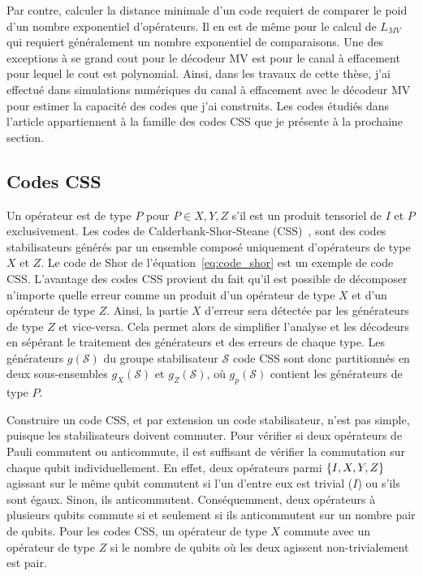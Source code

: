 Par contre,
calculer la distance minimale d'un code requiert de comparer le poid d'un nombre exponentiel d'opérateurs.
Il en est de même pour le calcul de $L_{MV}$ qui requiert généralement un nombre exponentiel de comparaisons.
Une des exceptions à se grand cout pour le décodeur MV est pour le canal à effacement pour lequel
le cout est  polynomial.
Ainsi, dans les travaux de cette thèse,
j'ai effectué dans simulations numériques du canal à effacement avec le décodeur MV pour estimer la
capacité des codes que j'ai construits.
Les codes étudiés dans l'article appartiennent 
à la famille des codes CSS que je présente à la prochaine section.

\subsection{Codes CSS}

Un opérateur est de type $P$ pour $P \in {X, Y, Z}$ s'il est un produit tensoriel de $I$ et $P$ exclusivement.
Les codes de Calderbank-Shor-Steane (CSS)~\cite{calderbank_good_1996, steane_multiple-particle_nodate},
sont des codes stabilisateurs générés par un ensemble composé uniquement d'opérateurs de type $X$ et $Z$.
Le code de Shor de l'équation~\ref{eq:code_shor} est un exemple de code CSS.
L'avantage des codes CSS provient du fait qu'il est possible de décomposer n'importe quelle erreur
comme un produit d'un opérateur de type $X$ et d'un opérateur de type $Z$.
Ainsi,
la partie $X$ d'erreur sera détectée par les générateurs de type $Z$ et vice-versa.
Cela permet alors de simplifier l'analyse et les décodeurs en sépérant le traitement des générateurs 
et des erreurs de chaque type.
Les générateurs $g(\mathcal S)$ du groupe stabilisateur $\mathcal S$
code CSS sont donc partitionnés en deux sous-ensembles $g_X(\mathcal S)$ et $g_Z(\mathcal S)$,
où $g_p(\mathcal S)$ contient les générateurs de type $P$.

Construire un code CSS, et par extension un code stabilisateur, n'est pas simple,
puisque les stabilisateurs doivent commuter.
Pour vérifier si deux opérateurs de Pauli commutent ou anticommute,
il est suffisant de vérifier la commutation sur chaque qubit individuellement.
En effet,
deux opérateurs parmi $\qty{I, X, Y, Z}$ agissant sur le même qubit commutent si l'un d'entre 
eux est trivial ($I$) ou s'ils sont égaux.
Sinon, ils anticommutent.
Conséquemment,
deux opérateurs à plusieurs qubits commute si et seulement si ils anticommutent sur un nombre 
pair de qubits.
Pour les codes CSS, 
un opérateur de type $X$ commute avec un opérateur de type $Z$ si le nombre de qubits où les deux
agissent non-trivialement est pair.

